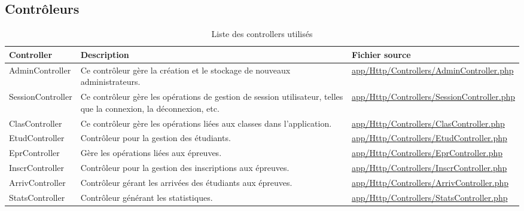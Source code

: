 \subsection{Contrôleurs}

\begin{table}[h]
	\begin{adjustbox}{width=\textwidth}
		\begin{tabular}{|l|p{}|p{}|}
			\hline
			\textbf{Controller} & \textbf{Description} & \textbf{Fichier source} \\
			\hline
			AdminController & Ce contrôleur gère la création et le stockage de nouveaux administrateurs. & \url{app/Http/Controllers/AdminController.php} \\
			SessionController 	& Ce contrôleur gère les opérations de gestion de session utilisateur, telles que la connexion, la déconnexion, etc. 	& \url{app/Http/Controllers/SessionController.php} \\
			ClasController 		& Ce contrôleur gère les opérations liées aux classes dans l'application. 											& \url{app/Http/Controllers/ClasController.php} \\
			EtudController 		& Contrôleur pour la gestion des étudiants. 																			& \url{app/Http/Controllers/EtudController.php} \\
			EprController 		& Gère les opérations liées aux épreuves. 																			& \url{app/Http/Controllers/EprController.php} \\
			InscrController 	& Contrôleur pour la gestion des inscriptions aux épreuves. 															& \url{app/Http/Controllers/InscrController.php} \\
			ArrivController 	& Contrôleur gérant les arrivées des étudiants aux épreuves. 															& \url{app/Http/Controllers/ArrivController.php} \\
			StatsController 	& Contrôleur générant les statistiques. 																				& \url{app/Http/Controllers/StatsController.php} \\
			\hline
		\end{tabular}
	\end{adjustbox}
	\caption{Liste des controllers utilisés}
\end{table}